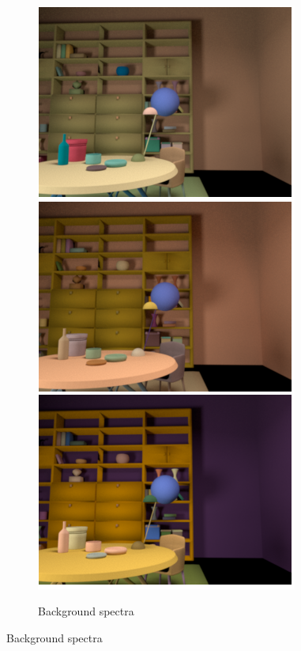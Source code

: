 \documentclass{jov}
\begin{document}
\begin{figure}
\begin{subfigure}[b]{0.18 \textwidth}
        \label{fig:illuminationVariation}
    \end{subfigure}
          ~  
    \begin{subfigure}[b]{0.18 \textwidth}
    \centering
        \caption{Background spectra}
        \includegraphics[width=\textwidth]{../FiguresDraft5/Figure4/Figure4_b.png}
        \label{fig:backGroundVariation}
    \end{subfigure}


\end{figure}
\end{document}
